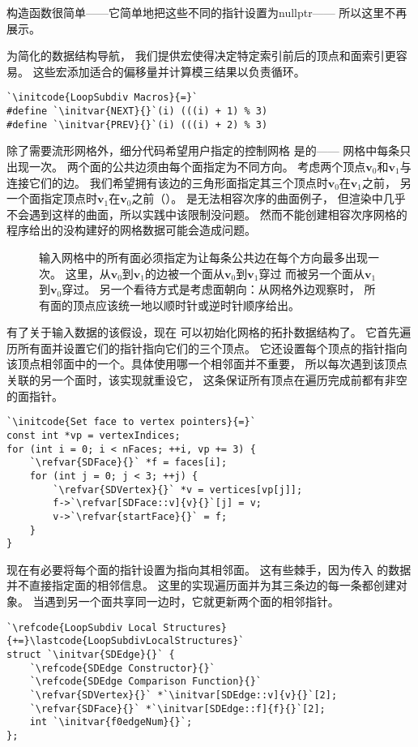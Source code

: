 构造函数很简单——它简单地把这些不同的指针设置为{\ttfamily nullptr}——
所以这里不再展示。

为简化的数据结构导航，
我们提供宏使得决定特定索引前后的顶点和面索引更容易。
这些宏添加适合的偏移量并计算模三结果以负责循环。
\begin{lstlisting}
`\initcode{LoopSubdiv Macros}{=}`
#define `\initvar{NEXT}{}`(i) (((i) + 1) % 3)
#define `\initvar{PREV}{}`(i) (((i) + 2) % 3)
\end{lstlisting}

除了需要流形网格外，细分代码希望用户指定的控制网格
是的——
网格中每条只出现一次。
两个面的公共边须由每个面指定为不同方向。
考虑两个顶点$\bm v_0$和$\bm v_1$与连接它们的边。
我们希望拥有该边的三角形面指定其三个顶点时$\bm v_0$在$\bm v_1$之前，
另一个面指定顶点时$\bm v_1$在$\bm v_0$之前（）。
是无法相容次序的曲面例子，
但渲染中几乎不会遇到这样的曲面，所以实践中该限制没问题。
然而不能创建相容次序网格的程序给出的没构建好的网格数据可能会造成问题。
\begin{figure}[htbp]
    \centering
    \caption{输入网格中的所有面必须指定为让每条公共边在每个方向最多出现一次。
        这里，从$\bm v_0$到$\bm v_1$的边被一个面从$\bm v_0$到$\bm v_1$穿过
        而被另一个面从$\bm v_1$到$\bm v_0$穿过。
        另一个看待方式是考虑面朝向：从网格外边观察时，
        所有面的顶点应该统一地以顺时针或逆时针顺序给出。}
    \label{fig:3.28}
\end{figure}

有了关于输入数据的该假设，现在
可以初始化网格的拓扑数据结构了。
它首先遍历所有面并设置它们的指针指向它们的三个顶点。
它还设置每个顶点的指针指向
该顶点相邻面中的一个。具体使用哪一个相邻面并不重要，
所以每次遇到该顶点关联的另一个面时，该实现就重设它，
这条保证所有顶点在遍历完成前都有非空的面指针。
\begin{lstlisting}
`\initcode{Set face to vertex pointers}{=}`
const int *vp = vertexIndices;
for (int i = 0; i < nFaces; ++i, vp += 3) {
    `\refvar{SDFace}{}` *f = faces[i];
    for (int j = 0; j < 3; ++j) {
        `\refvar{SDVertex}{}` *v = vertices[vp[j]];
        f->`\refvar[SDFace::v]{v}{}`[j] = v;
        v->`\refvar{startFace}{}` = f;
    }
}
\end{lstlisting}

现在有必要将每个面的指针设置为指向其相邻面。
这有些棘手，因为传入
的数据并不直接指定面的相邻信息。
这里的实现遍历面并为其三条边的每一条都创建对象。
当遇到另一个面共享同一边时，它就更新两个面的相邻指针。
\begin{lstlisting}
`\refcode{LoopSubdiv Local Structures}{+=}\lastcode{LoopSubdivLocalStructures}`
struct `\initvar{SDEdge}{}` {
    `\refcode{SDEdge Constructor}{}`
    `\refcode{SDEdge Comparison Function}{}`
    `\refvar{SDVertex}{}` *`\initvar[SDEdge::v]{v}{}`[2];
    `\refvar{SDFace}{}` *`\initvar[SDEdge::f]{f}{}`[2];
    int `\initvar{f0edgeNum}{}`;
};
\end{lstlisting}

